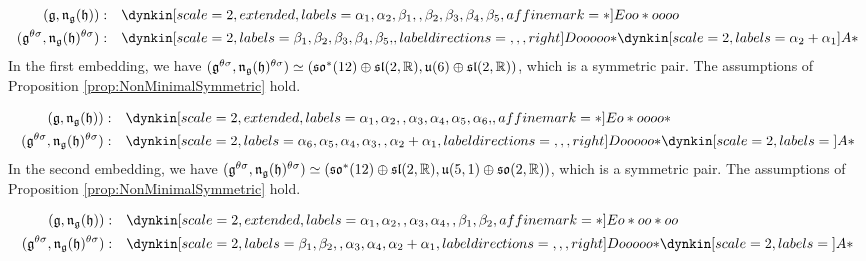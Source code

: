 \begin{align*}
	(\lie{g}, \lieNorm_{\lie{g}}(\lie{h})): \quad & \dynkin[scale=2, extended, labels={\alpha_1, \alpha_2, \beta_1, , \beta_2, \beta_3, \beta_4, \beta_5}, affine mark=*]{E}{oo*oooo} \\
	(\lie{g}^{\theta\sigma}, \lieNorm_{\lie{g}}(\lie{h})^{\theta\sigma}): \quad & \dynkin[scale=2, labels={\beta_1, \beta_2, \beta_3, \beta_4, \beta_5, }, label directions={,,,right}]{D}{ooooo*}
	\dynkin[scale=2, labels={\alpha_2 + \alpha_1}]{A}{*}
\end{align*}
In the first embedding, we have $(\mathfrak{g}^{\theta\sigma}, \mathfrak{n}_{\mathfrak{g}}(\mathfrak{h})^{\theta\sigma}) \simeq (\mathfrak{so}^*(12) \oplus \mathfrak{sl}(2,\mathbb{R}), \mathfrak{u}(6) \oplus\mathfrak{sl}(2,\mathbb{R}))$, which is a symmetric pair.
The assumptions of Proposition \ref{prop:NonMinimalSymmetric} hold.

\begin{align*}
	(\lie{g}, \lieNorm_{\lie{g}}(\lie{h})): \quad & \dynkin[scale=2, extended, labels={\alpha_1, \alpha_2, , \alpha_3, \alpha_4, \alpha_5, \alpha_6, }, affine mark=*]{E}{o*oooo*} \\
	(\lie{g}^{\theta\sigma}, \lieNorm_{\lie{g}}(\lie{h})^{\theta\sigma}): \quad & \dynkin[scale=2, labels={\alpha_6, \alpha_5, \alpha_4, \alpha_3, , \alpha_2 + \alpha_1}, label directions={,,,right}]{D}{ooooo*}
	\dynkin[scale=2, labels={}]{A}{*}
\end{align*}
In the second embedding, we have $(\mathfrak{g}^{\theta\sigma}, \mathfrak{n}_{\mathfrak{g}}(\mathfrak{h})^{\theta\sigma}) \simeq (\mathfrak{so}^*(12) \oplus \mathfrak{sl}(2,\mathbb{R}), \mathfrak{u}(5,1) \oplus\mathfrak{so}(2,\mathbb{R}))$, which is a symmetric pair.
The assumptions of Proposition \ref{prop:NonMinimalSymmetric} hold.


\begin{align*}
	(\lie{g}, \lieNorm_{\lie{g}}(\lie{h})): \quad & \dynkin[scale=2, extended, labels={\alpha_1, \alpha_2, , \alpha_3, \alpha_4, , \beta_1, \beta_2}, affine mark=*]{E}{o*oo*oo} \\
	(\lie{g}^{\theta\sigma}, \lieNorm_{\lie{g}}(\lie{h})^{\theta\sigma}): \quad & \dynkin[scale=2, labels={\beta_1, \beta_2, , \alpha_3, \alpha_4, \alpha_2 + \alpha_1}, label directions={,,,right}]{D}{ooooo*}
	\dynkin[scale=2, labels={}]{A}{*}
\end{align*}

